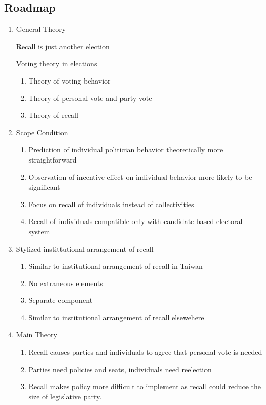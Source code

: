 \documentclass[hyphens, crop=false]{standalone}
\begin{document}
	\subsection*{Roadmap}
	\begin{enumerate}
		\item 
		General Theory
		
		Recall is just another election
		
		Voting theory in elections
		\begin{enumerate}
			\item 
			Theory of voting behavior
			\item 
			Theory of personal vote and party vote
			\item 
			Theory of recall
		\end{enumerate}
		\item 
		Scope Condition
		\begin{enumerate}
			\item 
			Prediction of individual politician behavior theoretically more straightforward
			\item 
			Observation of incentive effect on individual behavior more likely to be significant
			\item 
			Focus on recall of individuals instead of collectivities
			\item 
			Recall of individuals compatible only with candidate-based electoral system
		\end{enumerate}
		\item 
		Stylized instittutional arrangement of recall
		\begin{enumerate}
			\item 
			Similar to institutional arrangement of recall in Taiwan
			\item 
			No extraneous elements
			\item 
			Separate component
			\item 
			Similar to institutional arrangement of recall elsewehere
		\end{enumerate}
		\item 
		Main Theory
		\begin{enumerate}
			\item 
			Recall causes parties and individuals to agree that personal vote is needed
			\item 
			Parties need policies and seats, individuals need reelection
			\item 
			Recall makes policy more difficult to implement
			as recall could reduce the size of legislative party.

\end{enumerate}
\end{enumerate}
\end{document}
